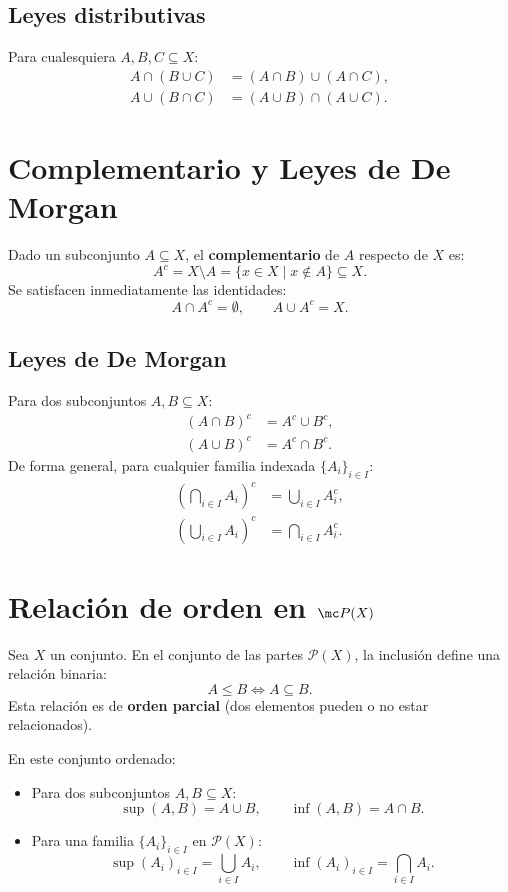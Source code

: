 \subsection*{Leyes distributivas}
Para cualesquiera $A, B, C \subseteq X$:
\begin{align*}
    A \cap (B \cup C) &= (A \cap B) \cup (A \cap C) \text{}, \\
    A \cup (B \cap C) &= (A \cup B) \cap (A \cup C) \text{}.
\end{align*}

\section{Complementario y Leyes de De Morgan}

Dado un subconjunto $A \subseteq X$, el \textbf{complementario} de $A$ respecto de $X$ es:
$$
    A^c = X \setminus A = \{x \in X \mid x \notin A\} \subseteq X \text{}.
$$
Se satisfacen inmediatamente las identidades:
$$
    A \cap A^c = \emptyset, \qquad A \cup A^c = X \text{}.
$$

\subsection*{Leyes de De Morgan}
Para dos subconjuntos $A, B \subseteq X$:
\begin{align*}
    (A \cap B)^c &= A^c \cup B^c \text{}, \\
    (A \cup B)^c &= A^c \cap B^c \text{}.
\end{align*}
De forma general, para cualquier familia indexada $\{A_i\}_{i \in I}$:
\begin{align*}
    \left( \bigcap_{i \in I} A_i \right)^c &= \bigcup_{i \in I} A_i^c \text{}, \\
    \left( \bigcup_{i \in I} A_i \right)^c &= \bigcap_{i \in I} A_i^c \text{}.
\end{align*}

\section{Relación de orden en $\mc P (X)$}

Sea $X$ un conjunto. En el conjunto de las partes $\mathcal{P}(X)$, la inclusión define una relación binaria:
$$
    A \le B \iff A \subseteq B \text{}.
$$
Esta relación es de \textbf{orden parcial} (dos elementos pueden o no estar relacionados). 

En este conjunto ordenado:
\begin{itemize}
    \item Para dos subconjuntos $A, B \subseteq X$:
    $$
        \sup(A, B) = A \cup B, \qquad \inf(A, B) = A \cap B \text{}.
    $$
    \item Para una familia $\{A_i\}_{i \in I}$ en $\mathcal{P}(X)$:
    $$
        \sup(A_i)_{i \in I} = \bigcup_{i \in I} A_i, \qquad \inf(A_i)_{i \in I} = \bigcap_{i \in I} A_i \text{}.
    $$
\end{itemize}

